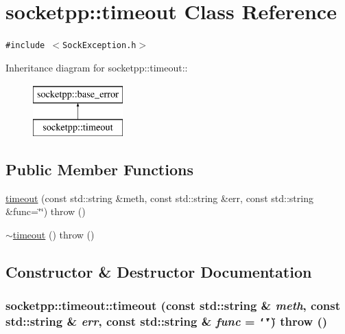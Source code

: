 \hypertarget{classsocketpp_1_1timeout}{
\section{socketpp::timeout Class Reference}
\label{classsocketpp_1_1timeout}
}
{\tt \#include $<$SockException.h$>$}

Inheritance diagram for socketpp::timeout::\begin{figure}[H]
\begin{center}
\leavevmode
\includegraphics[height=2cm]{classsocketpp_1_1timeout}
\end{center}
\end{figure}
\subsection*{Public Member Functions}
\begin{CompactItemize}
\item 
\hyperlink{classsocketpp_1_1timeout_e93bd15dc9a3209c582782770b909049}{timeout} (const std::string \&meth, const std::string \&err, const std::string \&func=\char`\"{}\char`\"{})  throw ()
\item 
\hyperlink{classsocketpp_1_1timeout_8593bc6e69d1f62e41332e4b3809b3e7}{$\sim$timeout} ()  throw ()
\end{CompactItemize}


\subsection{Constructor \& Destructor Documentation}
\hypertarget{classsocketpp_1_1timeout_e93bd15dc9a3209c582782770b909049}{
\subsubsection[{timeout}]{\setlength{\rightskip}{0pt plus 5cm}socketpp::timeout::timeout (const std::string \& {\em meth}, \/  const std::string \& {\em err}, \/  const std::string \& {\em func} = {\tt \char`\"{}\char`\"{}})  throw ()}}
\label{classsocketpp_1_1timeout_e93bd15dc9a3209c582782770b909049}



